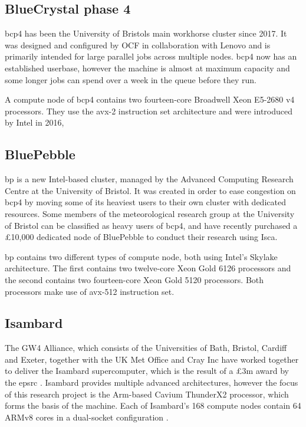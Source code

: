 \documentclass[a4paper,11pt]{report}
\begin{document}

\subsection{BlueCrystal phase 4}
\gls{bcp4} has been the University of Bristols main workhorse cluster since 2017. It was designed and configured by OCF in collaboration with Lenovo and is primarily intended for large parallel jobs across multiple nodes. \gls{bcp4} now has an established userbase, however the machine is almost at maximum capacity and some longer jobs can spend over a week in the queue before they run.
\par
A compute node of \gls{bcp4} contains two fourteen-core Broadwell Xeon E5-2680 v4 processors. They use the \gls{avx}-2 instruction set architecture and were introduced by Intel in 2016, 

\subsection{BluePebble}
\gls{bp} is a new Intel-based cluster, managed by the Advanced Computing Research Centre at the University of Bristol. It was created in order to ease congestion on \gls{bcp4} by moving some of its heaviest users to their own cluster with dedicated resources. Some members of the meteorological research group at the University of Bristol can be classified as heavy users of \gls{bcp4}, and have recently purchased a £10,000 dedicated node of BluePebble to conduct their research using Isca. 
\par
\gls{bp} contains two different types of compute node, both using Intel's Skylake architecture. The first contains two twelve-core Xeon Gold 6126 processors and the second contains two fourteen-core Xeon Gold 5120 processors. Both processors make use of \gls{avx}-512 instruction set. 


\subsection{Isambard}
The GW4 Alliance, which consists of the Universities of Bath, Bristol, Cardiff and Exeter, together with the UK Met Office and Cray Inc have worked together to deliver the Isambard supercomputer, which is the result of a £3m award by the \gls{epsrc} \cite{arm2018white}. Isambard provides multiple advanced architectures, however the focus of this research project is the Arm-based Cavium ThunderX2 processor, which forms the basis of the machine. Each of Isambard's 168 compute nodes contain 64 ARMv8 cores in a dual-socket configuration \cite{thunderprocessor2018brief}. 
\end{document}
